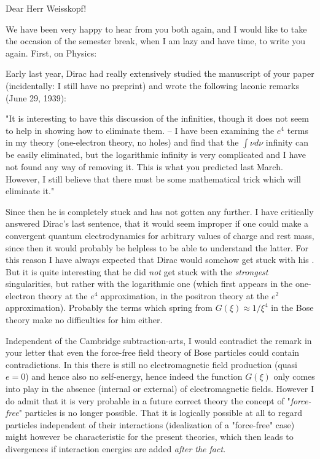 \date{March 10, 1940}

Dear Herr Weisskopf!

We have been very happy to hear from you both again, and I would like to take the occasion of the semester break, when I am lazy and have time, to write you again. First, on Physics:

Early last year, Dirac had really extensively studied the manuscript of your paper (incidentally: I still have no preprint) and wrote the following laconic remarks (June 29, 1939):

"It is interesting to have this discussion of the infinities, though it does not seem to help in showing how to eliminate them. -- I have been examining the $e^4$ terms in my theory (one-electron theory, no holes) and find that the $\int\nu{d\nu}$ infinity can be easily eliminated, but the logarithmic infinity is very complicated and I have not found any way of removing it. This is what you predicted last March. However, I still believe that there must be some mathematical trick which will eliminate it."

Since then he is completely stuck and has not gotten any further. I have critically answered Dirac's last sentence, that it would seem improper if one could make a convergent quantum electrodynamics for arbitrary values of charge and rest mass, since then it would probably be helpless to be able to understand the latter. For this reason I have always expected that Dirac would somehow get stuck with his . But it is quite interesting that he did \textit{not} get stuck with the \textit{strongest} singularities, but rather with the logarithmic one (which first appears in the one-electron theory at the $e^4$ approximation, in the positron theory at the $e^2$ approximation). Probably the terms which spring from $G(\xi) \approx 1/\xi^4$ in the Bose theory make no difficulties for him either.

Independent of the Cambridge subtraction-arts, I would contradict the remark in your letter that even the force-free field theory of Bose particles could contain contradictions. In this there is still no electromagnetic field production (quasi $e=0$) and hence also no self-energy, hence indeed the function $G(\xi)$ only comes into play in the absence (internal or external) of electromagnetic fields. However I do admit that it is very probable in a future correct theory the concept of "\textit{force-free}" particles is no longer possible. That it is logically possible at all to regard particles independent of their interactions (idealization of a "force-free" case) might however be characteristic for the present theories, which then leads to divergences if interaction energies are added \textit{after the fact}.

